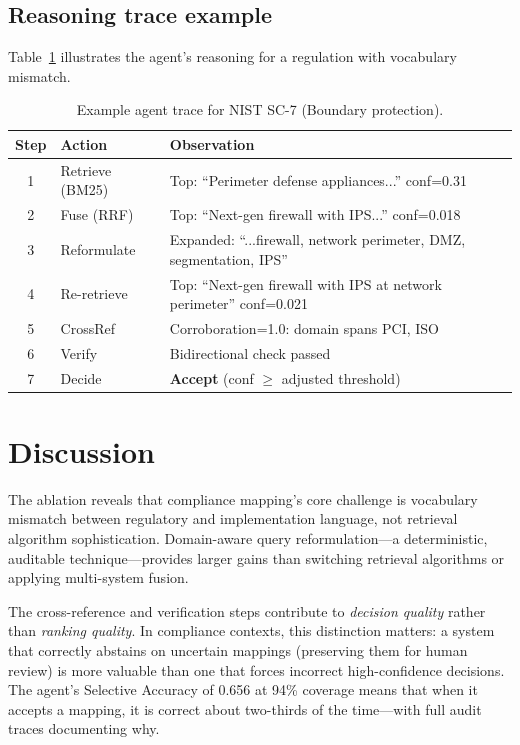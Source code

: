 \documentclass{sn-jnl}
\begin{document}
\subsection{Reasoning trace example}
Table~\ref{tab:trace} illustrates the agent's reasoning for a regulation with vocabulary mismatch.

\begin{table}[h]
\caption{Example agent trace for NIST SC-7 (Boundary protection).}
\label{tab:trace}
\centering
\small
\begin{tabular}{clp{7cm}}
\hline
Step & Action & Observation \\
\hline
1 & Retrieve (BM25) & Top: ``Perimeter defense appliances...'' conf=0.31 \\
2 & Fuse (RRF) & Top: ``Next-gen firewall with IPS...'' conf=0.018 \\
3 & Reformulate & Expanded: ``...firewall, network perimeter, DMZ, segmentation, IPS'' \\
4 & Re-retrieve & Top: ``Next-gen firewall with IPS at network perimeter'' conf=0.021 \\
5 & CrossRef & Corroboration=1.0: domain spans PCI, ISO \\
6 & Verify & Bidirectional check passed \\
7 & Decide & \textbf{Accept} (conf $\geq$ adjusted threshold) \\
\hline
\end{tabular}
\end{table}

\section{Discussion}
The ablation reveals that compliance mapping's core challenge is vocabulary mismatch between regulatory and implementation language, not retrieval algorithm sophistication.
Domain-aware query reformulation---a deterministic, auditable technique---provides larger gains than switching retrieval algorithms or applying multi-system fusion.

The cross-reference and verification steps contribute to \emph{decision quality} rather than \emph{ranking quality}.
In compliance contexts, this distinction matters: a system that correctly abstains on uncertain mappings (preserving them for human review) is more valuable than one that forces incorrect high-confidence decisions.
The agent's Selective Accuracy of 0.656 at 94\% coverage means that when it accepts a mapping, it is correct about two-thirds of the time---with full audit traces documenting why.
\end{document}
